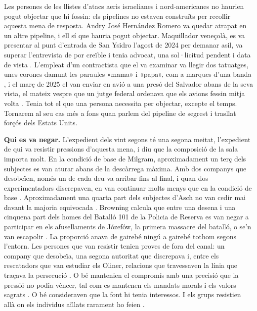 Les persones de les llistes d'atacs aeris israelianes i nord-americanes no haurien pogut objectar que hi fossin: els pipelines no estaven construïts per recollir aquesta mena de resposta. Andry José Hernández Romero va quedar atrapat en un altre pipeline, i ell sí que hauria pogut objectar. Maquillador veneçolà, es va presentar al punt d'entrada de San Ysidro l'agost de 2024 per demanar asil, va superar l'entrevista de por creïble i tenia advocat, una sol·licitud pendent i data de vista \autocite{LULAC2025HernandezRomero,Vega2025HernandezRomero}. L'empleat d'un contractista que el va examinar va llegir dos tatuatges, unes corones damunt les paraules «mama» i «papa», com a marques d'una banda \autocite{Palomera2025Blade}, i el març de 2025 el van enviar en avió a una presó del Salvador abans de la seva vista, el mateix vespre que un jutge federal ordenava que els avions fessin mitja volta \autocite{jgg2025contempt}. Tenia tot el que una persona necessita per objectar, excepte el temps. Tornarem al seu cas més a fons quan parlem del pipeline de segrest i trasllat forçós dels Estats Units.

\textbf{Qui es va negar.} L'expedient dels vint segons té una segona meitat, l'expedient de qui va resistir pressions d'aquesta mena, i diu que la composició de la sala importa molt. En la condició de base de Milgram, aproximadament un terç dels subjectes es van aturar abans de la descàrrega màxima. Amb dos companys que desobeïen, només un de cada deu va arribar fins al final, i quan dos experimentadors discrepaven, en van continuar molts menys que en la condició de base \autocite{milgram1974obedience}. Aproximadament una quarta part dels subjectes d'Asch no van cedir mai davant la majoria equivocada \autocite{asch1956studies}. Browning calcula que entre una desena i una cinquena part dels homes del Batalló 101 de la Policia de Reserva es van negar a participar en els afusellaments de Józefów, la primera massacre del batalló, o se'n van escapolir \autocite{browning1992ordinary}. La proporció anava de gairebé ningú a gairebé tothom segons l'entorn. Les persones que van resistir tenien proves de fora del canal: un company que desobeïa, una segona autoritat que discrepava i, entre els rescatadors que van estudiar els Oliner, relacions que travessaven la línia que traçava la persecució \autocite{oliner1988altruistic}. O bé mantenien el compromís amb una precisió que la pressió no podia vèncer, tal com es mantenen els mandats morals i els valors sagrats \autocite{skitka2009limits,ginges2007sacred}. O bé consideraven que la font hi tenia interessos. I els grups resistien allà on els individus aïllats rarament ho feien \autocite{gamson1982encounters}.

